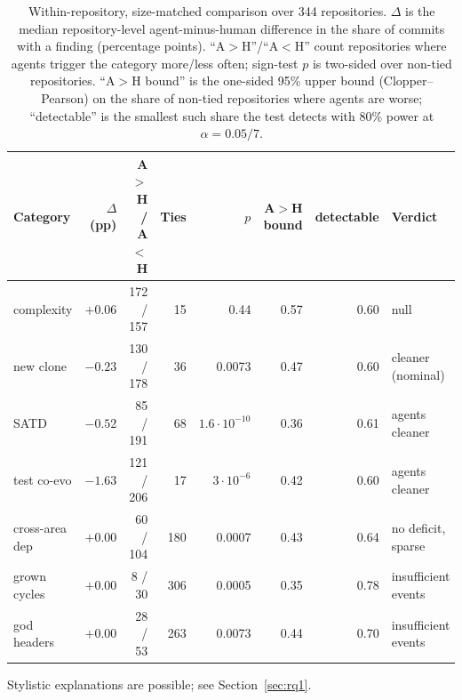 \documentclass[sigplan,11pt,nonacm=true]{acmart}
\begin{document}
\begin{table}[t]
\caption{Within-repository, size-matched comparison over 344 repositories.
$\Delta$ is the median repository-level agent-minus-human difference in the
share of commits with a finding (percentage points). ``A$>$H''/``A$<$H''
count repositories where agents trigger the category more/less often;
sign-test $p$ is two-sided over non-tied repositories. ``A$>$H bound'' is the
one-sided 95\% upper bound (Clopper--Pearson) on the share of non-tied
repositories where agents are worse; ``detectable'' is the smallest such share
the test detects with 80\% power at $\alpha=0.05/7$.}
\label{tab:seven}
\small
\begin{threeparttable}
\begin{tabular}{@{}lrrrrrrl@{}}
\toprule
Category & $\Delta$ (pp) & A$>$H / A$<$H & Ties & $p$ & A$>$H bound & detectable & Verdict \\
\midrule
complexity      & $+0.06$ & 172 / 157 & 15  & 0.44               & 0.57 & 0.60 & null \\
new clone       & $-0.23$ & 130 / 178 & 36  & 0.0073             & 0.47 & 0.60 & cleaner (nominal) \\
SATD            & $-0.52$ & 85 / 191  & 68  & $1.6\cdot10^{-10}$ & 0.36 & 0.61 & agents cleaner\tnote{\dag} \\
test co-evo     & $-1.63$ & 121 / 206 & 17  & $3\cdot10^{-6}$    & 0.42 & 0.60 & agents cleaner\tnote{\dag} \\
cross-area dep  & $+0.00$ & 60 / 104  & 180 & 0.0007             & 0.43 & 0.64 & no deficit, sparse \\
grown cycles    & $+0.00$ & 8 / 30    & 306 & 0.0005             & 0.35 & 0.78 & insufficient events \\
god headers     & $+0.00$ & 28 / 53   & 263 & 0.0073             & 0.44 & 0.70 & insufficient events \\
\bottomrule
\end{tabular}
\begin{tablenotes}\footnotesize
\item[\dag] Stylistic explanations are possible; see Section~\ref{sec:rq1}.
\end{tablenotes}
\end{threeparttable}
\end{table}
\end{document}
